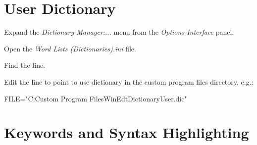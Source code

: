 \section{User Dictionary}
\begin{numberedlist}
	\item Expand the \textit{Dictionary Manager:...} menu from the \textit{Options Interface} panel.
	\item Open the \textit{Word Lists (Dictionaries).ini} file.
	\item Find the  line.
	\item Edit the  line to point to use dictionary in the custom program files directory, e.g.:
	\begin{plainlist}
		\item FILE="C:\tbs{}Custom Program Files\tbs{}WinEdt\tbs{}Dictionary\tbs{}User.dic"
	\end{plainlist}
\end{numberedlist}

\section{Keywords and Syntax Highlighting}
